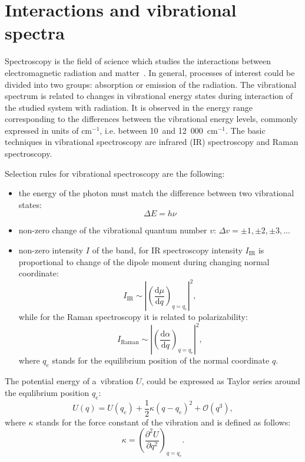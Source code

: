 \section{Interactions and vibrational spectra}

Spectroscopy is the field of science which studies the interactions between electromagnetic radiation and matter~\cite{kecki}. In general, processes of interest could be divided into two groups: absorption or emission of the radiation. The vibrational spectrum is related to changes in vibrational energy states during interaction of the studied system with radiation. It is observed in the energy range corresponding to the differences between the vibrational energy levels, commonly expressed in units of cm$^{-1}$, i.e. between 10~and 12~000~cm$^{-1}$. The basic techniques in vibrational spectroscopy are infrared (IR) spectroscopy and Raman spectroscopy.

Selection rules for vibrational spectroscopy are the following:
\begin{itemize}
    \item the energy of the photon must match the difference between two vibrational states:
    \begin{equation}
        \Delta E = h \nu
    \end{equation}
    \item non-zero change of the vibrational quantum number $v$: $\Delta v = \pm 1, \pm 2, \pm 3, ...$
    \item non-zero intensity $I$ of the band, for IR spectroscopy intensity $I_{\text{IR}}$ is proportional to change of the dipole moment during changing normal coordinate:
    \begin{equation}
    I_{\text{IR}} \sim \left| \left( \frac{\text{d} \mu}{\text{d} q} \right)_{q = q_e} \right|^2,
    \label{eq:ir-proportion}
    \end{equation}
    while for the Raman spectroscopy it is related to polarizability:
    \begin{equation}
        I_{\text{Raman}} \sim \left| \left( \frac{\text{d} \alpha}{\text{d} q} \right)_{q = q_e} \right|^2,
    \end{equation}
    where $q_e$ stands for the equilibrium position of the normal coordinate $q$.
\end{itemize}

The potential energy of a~vibration $U$, could be expressed as Taylor series around the equlibrium position $q_e$:
\begin{equation}
    U(q) = U(q_e) + \frac{1}{2} \kappa (q - q_e)^2 + \mathcal{O}(q^3),
    \label{eq:potential-energy-vibration}
\end{equation}
where $\kappa$ stands for the force constant of the vibration and is defined as follows:
\begin{equation}
    \kappa = \left( \frac{\partial^2 U}{\partial q^2}\right)_{q = q_e}.
\end{equation}

